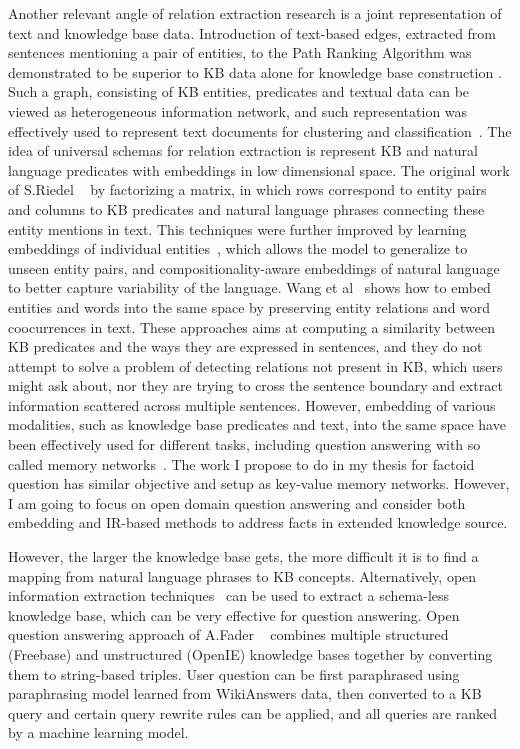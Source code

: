 Another relevant angle of relation extraction research is a joint representation of text and knowledge base data.
Introduction of text-based edges, extracted from sentences mentioning a pair of entities, to the Path Ranking Algorithm was demonstrated to be superior to KB data alone for knowledge base construction \cite{lao2012reading}.
Such a graph, consisting of KB entities, predicates and textual data can be viewed as heterogeneous information network, and such representation was effectively used to represent text documents for clustering and classification~\cite{wang2016text,wang2015incorporating}.
The idea of universal schemas for relation extraction is represent KB and natural language predicates with embeddings in low dimensional space.
The original work of S.Riedel \etal~\cite{riedel2013relation} by factorizing a matrix, in which rows correspond to entity pairs and columns to KB predicates and natural language phrases connecting these entity mentions in text.
This techniques were further improved by learning embeddings of individual entities~\cite{verga2016row}, which allows the model to generalize to unseen entity pairs, and compositionality-aware embeddings of natural language~\cite{toutanova2015representing} to better capture variability of the language.
Wang et al~\cite{wang2014knowledge} shows how to embed entities and words into the same space by preserving entity relations and word coocurrences in text.
These approaches aims at computing a similarity between KB predicates and the ways they are expressed in sentences, and they do not attempt to solve a problem of detecting relations not present in KB, which users might ask about, nor they are trying to cross the sentence boundary and extract information scattered across multiple sentences.
However, embedding of various modalities, such as knowledge base predicates and text, into the same space have been effectively used for different tasks, including question answering with so called memory networks~\cite{bordes2015large,miller2016key}.
The work I propose to do in my thesis for factoid question has similar objective and setup as key-value memory networks.
However, I am going to focus on open domain question answering and consider both embedding and IR-based methods to address facts in extended knowledge source.

However, the larger the knowledge base gets, the more difficult it is to find a mapping from natural language phrases to KB concepts.
Alternatively, open information extraction techniques~\cite{Etzioni:2008:OIE:1409360.1409378} can be used to extract a schema-less knowledge base, which can be very effective for question answering.
Open question answering approach of A.Fader \etal~\cite{Fader:2014:OQA:2623330.2623677,yin2015answering} combines multiple structured (Freebase) and unstructured (OpenIE) knowledge bases together by converting them to string-based triples.
User question can be first paraphrased using paraphrasing model learned from WikiAnswers data, then converted to a KB query and certain query rewrite rules can be applied, and all queries are ranked by a machine learning model.

